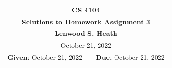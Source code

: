 \documentclass[11pt,twoside]{article}
\newcommand{\coursenumber}{CS 4104}
\newcommand{\docdate}{October 17, 2022}
\newcommand{\duedate}{October 21, 2022}
\newcommand{\homeworknumber}{3}
\newcommand{\doctitle}{Solutions to Homework Assignment \homeworknumber}
\newcommand{\doctitle}{Midterm}
\renewcommand{\docdate}{\duedate}
\renewcommand{\author}{Lenwood S. Heath}
\begin{document}
\thispagestyle{empty}

\begin{center}
\begin{tabular}{lcr}
\multicolumn{3}{c}{\Large\textbf{\coursenumber}}
\\[0.04in]
\multicolumn{3}{c}{\Large\textbf{\doctitle}}
\ifthenelse{\boolean{solutions}}{%
\\[0.04in]\multicolumn{3}{c}{\large\textbf{\author}}
}{} %
\ifthenelse{\boolean{solutions}}{%
\\[0.10in]\multicolumn{3}{c}{\duedate}
}{%
\\[0.10in]
\textbf{Given:} \docdate
& \hspace*{1.0in} &
\textbf{Due:} \duedate
}
\end{tabular}
\end{center}
\end{document}
